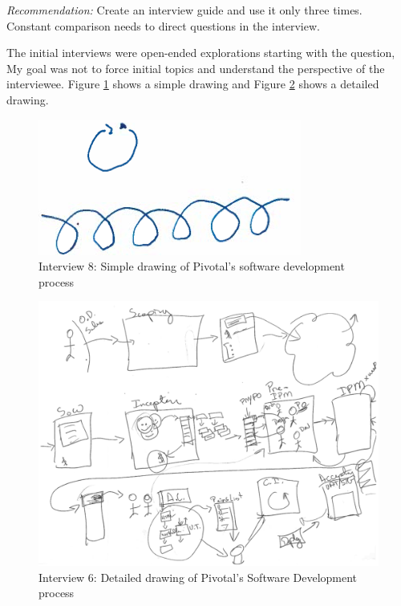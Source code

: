 \textit{Recommendation:} Create an interview guide and use it only three times. Constant comparison needs to direct questions in the interview.

The initial interviews were open-ended explorations starting with the question,  My goal was not to force initial topics and understand the perspective of the interviewee. Figure \ref{2015_08_12_simple} shows a simple drawing and Figure \ref{2015_08_12_detailed} shows a detailed drawing. 

\begin{figure}[htbp]
\centering
\includegraphics[width=\oneColumnWidth{}]{drawings/interview8.png}
\caption{Interview 8: Simple drawing of Pivotal's software development process}
\label{2015_08_12_simple}
\end{figure}

\begin{figure}[htbp]
\centering
\includegraphics[width=\oneColumnWidth{}]{drawings/2015_08_12_anchor.png}
\caption{Interview 6: Detailed drawing of Pivotal's Software Development process}
\label{2015_08_12_detailed}
\end{figure}

